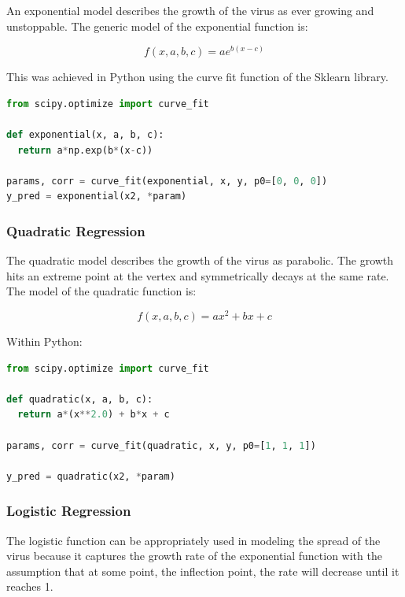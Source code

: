 \documentclass{homework}
\begin{document}
An exponential model describes the growth of the virus as ever growing and unstoppable. The generic model of the exponential function is:

\begin{equation}
  f(x, a, b, c) = a e^{b(x-c)}
\end{equation}

This was achieved in Python using the curve fit function of the Sklearn library.

\begin{lstlisting}[language=Python, caption={Exponential Model}]
from scipy.optimize import curve_fit

def exponential(x, a, b, c):
  return a*np.exp(b*(x-c))

params, corr = curve_fit(exponential, x, y, p0=[0, 0, 0])
y_pred = exponential(x2, *param)
\end{lstlisting}

\subsubsection{Quadratic Regression}

The quadratic model describes the growth of the virus as parabolic. The growth hits an extreme point at the vertex and symmetrically decays at the same rate. The model of the quadratic function is:

\begin{equation}
  f(x, a, b, c) = ax^2 + bx + c
\end{equation}

Within Python:

\begin{lstlisting}[language=Python, caption={Quadratic Model}]
from scipy.optimize import curve_fit
  
def quadratic(x, a, b, c):
  return a*(x**2.0) + b*x + c
  
params, corr = curve_fit(quadratic, x, y, p0=[1, 1, 1])

y_pred = quadratic(x2, *param)
\end{lstlisting}

\subsubsection{Logistic Regression}

The logistic function can be appropriately used in modeling the spread of the virus because it captures the growth rate of the exponential function with the assumption that at some point, the inflection point, the rate will decrease until it reaches 1. \\
\end{document}
